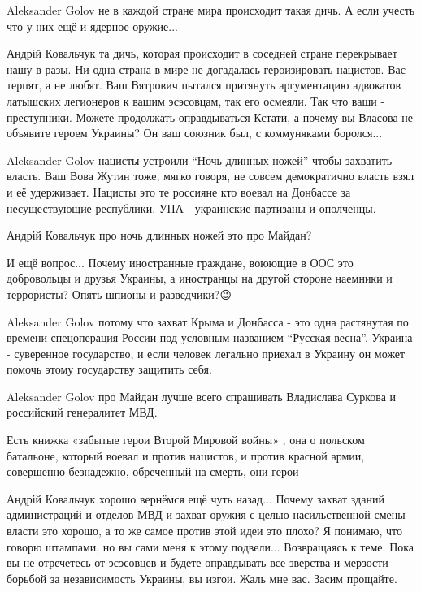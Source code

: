\begin{itemize}
Aleksander Golov не в каждой стране мира происходит такая дичь. А если учесть
что у них ещё и ядерное оружие...


Андрій Ковальчук та дичь, которая происходит в соседней стране перекрывает нашу
в разы.  Ни одна страна в мире не догадалась героизировать нацистов. Вас
терпят, а не любят.  Ваш Вятрович пытался притянуть аргументацию адвокатов
латышских легионеров к вашим эсэсовцам, так его осмеяли.  Так что ваши -
преступники. Можете продолжать оправдываться Кстати, а почему вы Власова не
объявите героем Украины? Он ваш союзник был, с коммуняками боролся...


Aleksander Golov нацисты устроили \enquote{Ночь длинных ножей} чтобы
захватить власть. Ваш Вова Жутин тоже, мягко говоря, не совсем демократично
власть взял и её удерживает. Нацисты это те россияне кто воевал на Донбассе за
несуществующие республики. УПА - украинские партизаны и ополченцы.


Андрій Ковальчук про ночь длинных ножей это про Майдан?


И ещё вопрос...  Почему иностранные граждане, воюющие в ООС это добровольцы и
друзья Украины, а иностранцы на другой стороне наемники и террористы?  Опять
шпионы и разведчики?😉


Aleksander Golov потому что захват Крыма и Донбасса - это одна растянутая по
времени спецоперация России под условным названием \enquote{Русская весна}. Украина -
суверенное государство, и если человек легально приехал в Украину он может
помочь этому государству защитить себя.


Aleksander Golov про Майдан лучше всего спрашивать Владислава Суркова и
российский генералитет МВД.


Есть книжка «забытые герои Второй Мировой войны» , она о польском батальоне,
который воевал и против нацистов, и против красной армии, совершенно
безнадежно, обреченный на смерть, они герои


Андрій Ковальчук хорошо вернёмся ещё чуть назад...
Почему захват зданий администраций и отделов МВД и захват оружия с целью насильственной смены власти это хорошо, а то же самое против этой идеи это плохо?
Я понимаю, что говорю штампами, но вы сами меня к этому подвели...
Возвращаясь к теме. Пока вы не отречетесь от эсэсовцев и будете оправдывать все зверства и мерзости борьбой за независимость Украины, вы изгои.
Жаль мне вас.
Засим прощайте.


\end{itemize}

